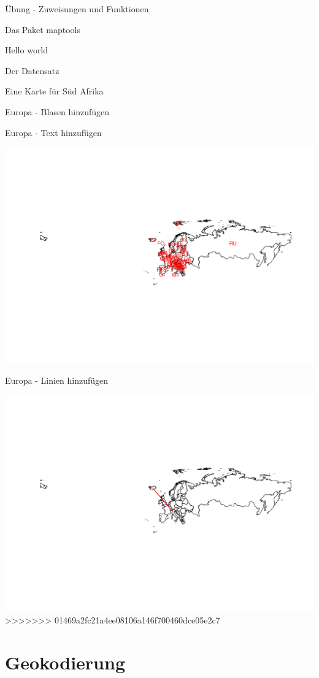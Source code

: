 \documentclass[ignorenonframetext,]{beamer}
\begin{document}
\begin{frame}[fragile]{Übung - Zuweisungen und Funktionen}
\begin{frame}[fragile]{Das Paket maptools}
\begin{frame}[fragile]{Hello world}
\begin{frame}[fragile]{Der Datensatz}
\begin{frame}[fragile]{Eine Karte für Süd Afrika}
\begin{frame}{Europa - Blasen hinzufügen}
\end{frame}

\begin{frame}{Europa - Text hinzufügen}

\includegraphics{Geomedizin_files/figure-beamer/unnamed-chunk-107-1.pdf}

\end{frame}

\begin{frame}{Europa - Linien hinzufügen}

\includegraphics{Geomedizin_files/figure-beamer/unnamed-chunk-109-1.pdf}
>>>>>>> 01469a2fc21a4ee08106a146f700460dce05e2c7

\end{frame}

\hypertarget{geokodierung}{%
\section{Geokodierung}\label{geokodierung}}


\end{frame}
\end{frame}
\end{frame}
\end{frame}
\end{frame}
\end{document}
